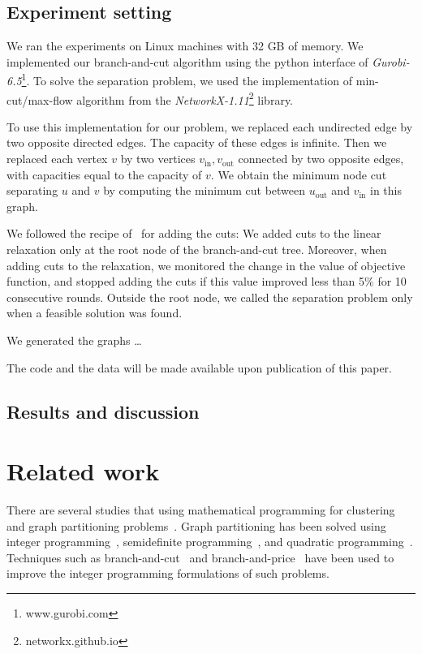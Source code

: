 \documentclass[conference,compsoc]{IEEEtran}
\begin{document}
\subsection{Experiment setting}
We ran the experiments on Linux machines with 32 GB of memory. We implemented our branch-and-cut algorithm using the python interface
of \emph{Gurobi-6.5}\footnote{www.gurobi.com}. To solve the separation problem, we used the implementation of min-cut/max-flow algorithm from the \emph{NetworkX-1.11}\footnote{networkx.github.io} library. 

To use this implementation for our problem, we replaced
each undirected edge by two opposite directed edges. The capacity of
these edges is infinite. Then we replaced each vertex $v$ by two
vertices $v_{\text{in}}, v_{\text{out}}$ connected by two opposite
edges, with capacities equal to the capacity of $v$. We obtain the
minimum node cut separating $u$ and $v$ by computing the minimum cut
between $u_{\text{out}}$ and $v_{\text{in}}$ in this graph.

We followed the recipe of~\cite{CarvajalCGVW13} for adding the cuts: We added cuts to the
linear relaxation only at the root node of the branch-and-cut tree.
Moreover, when adding cuts to the relaxation, we monitored the change in
the value of objective function, and stopped adding the cuts if this
value improved less than 5\% for 10 consecutive rounds. Outside the root
node, we called the separation problem only when a feasible solution was
found.

We generated the graphs \ldots

The code and the data will be made available upon publication of this paper.

\subsection{Results and discussion}

\section{Related work}
\label{sec:related}
There are several studies that using mathematical programming
for clustering and graph partitioning
problems~\cite{Hansen}. Graph partitioning has been solved using integer programming~\cite{REF}, semidefinite programming~\cite{REF}, and quadratic programming~\cite{REF}. Techniques such as branch-and-cut~\cite{REF} and branch-and-price~\cite{REF} have been used to improve the integer programming formulations of such problems. 
\end{document}
